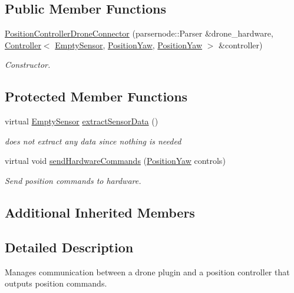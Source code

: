\subsection*{Public Member Functions}
\begin{DoxyCompactItemize}
\item 
\hyperlink{classPositionControllerDroneConnector_a12664821f9f9316f6343b16f3dc9f84f}{Position\-Controller\-Drone\-Connector} (parsernode\-::\-Parser \&drone\-\_\-hardware, \hyperlink{classController}{Controller}$<$ \hyperlink{structEmptySensor}{Empty\-Sensor}, \hyperlink{structPositionYaw}{Position\-Yaw}, \hyperlink{structPositionYaw}{Position\-Yaw} $>$ \&controller)
\begin{DoxyCompactList}\small\item\em Constructor. \end{DoxyCompactList}\end{DoxyCompactItemize}
\subsection*{Protected Member Functions}
\begin{DoxyCompactItemize}
\item 
virtual \hyperlink{structEmptySensor}{Empty\-Sensor} \hyperlink{classPositionControllerDroneConnector_a21859ad4bcc85a907e2e23456869b3d6}{extract\-Sensor\-Data} ()
\begin{DoxyCompactList}\small\item\em does not extract any data since nothing is needed \end{DoxyCompactList}\item 
virtual void \hyperlink{classPositionControllerDroneConnector_a826092eadfbbf9442fa1869fea98070d}{send\-Hardware\-Commands} (\hyperlink{structPositionYaw}{Position\-Yaw} controls)
\begin{DoxyCompactList}\small\item\em Send position commands to hardware. \end{DoxyCompactList}\end{DoxyCompactItemize}
\subsection*{Additional Inherited Members}


\subsection{Detailed Description}
Manages communication between a drone plugin and a position controller that outputs position commands. 

